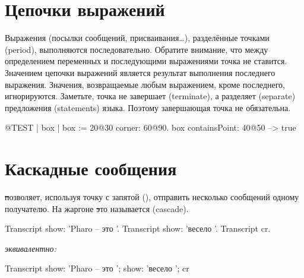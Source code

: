 \documentclass[a4paper,10pt,twoside]{book}
\begin{document}
\section{Цепочки выражений}
Выражения (\ie посылки сообщений, присваивания\dots), разделённые точками (period), выполняются последовательно.
Обратите внимание, что между определением переменных и последующими выражениями точка не ставится.
Значением цепочки выражений является результат выполнения последнего выражения. Значения, возвращаемые
любым выражением, кроме последнего, игнорируются. Заметьте, точка не завершает (terminate), а разделяет (separate) предложения (statements) языка. Поэтому завершающая точка не обязательна.

\begin{code}{@TEST}
| box |
box := 20@30 corner: 60@90.
box containsPoint: 40@50 --> true
\end{code}

\section{Каскадные сообщения}
\st позволяет, используя точку с запятой (\ct{;}), отправить несколько сообщений одному получателю. На жаргоне \st это называется  (cascade).


\begin{minipage}{0.35\textwidth}
\begin{code}{}
Transcript show: 'Pharo -- это '.
Transcript show: 'весело '.
Transcript cr.
\end{code}
\end{minipage}
\emph{эквивалентно:}
\begin{minipage}{0.35\textwidth}
\begin{code}{}
Transcript        
   show: 'Pharo -- это ';
   show: 'весело ';
   cr
\end{code}
\end{minipage}
\end{document}
